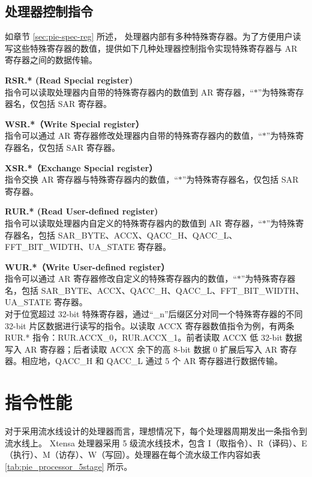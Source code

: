 \documentclass[main\_\_CN.tex]{subfiles}
\begin{document}


\subsection{处理器控制指令}
\label{sec:pie-processor-control-instrucitons}

如章节 \ref{sec:pie-spec-reg} 所述，\chipname{} 处理器内部有多种特殊寄存器。为了方便用户读写这些特殊寄存器的数值，提供如下几种处理器控制指令实现特殊寄存器与 AR 寄存器之间的数据传输。

\textbf{RSR.* (Read Special register)} \\ 指令可以读取处理器内自带的特殊寄存器内的数值到 AR 寄存器，“$*$”为特殊寄存器名，仅包括 SAR 寄存器。

\textbf{WSR.*（Write Special register）} \\
指令可以通过 AR 寄存器修改处理器内自带的特殊寄存器内的数值，“$*$”为特殊寄存器名，仅包括 SAR 寄存器。

\textbf{XSR.*（Exchange Special register）} \\
 指令交换 AR 寄存器与特殊寄存器内的数值，“$*$”为特殊寄存器名，仅包括 SAR 寄存器。

\textbf{RUR.* (Read User-defined register)}\\ 指令可以读取处理器内自定义的特殊寄存器内的数值到 AR 寄存器，“$*$”为特殊寄存器名，包括 SAR\_BYTE、ACCX、QACC\_H、QACC\_L、FFT\_BIT\_WIDTH、UA\_STATE 寄存器。

\textbf{WUR.*（Write User-defined register）}\\
指令可以通过 AR 寄存器修改自定义的特殊寄存器内的数值，“$*$”为特殊寄存器名，包括 SAR\_BYTE、ACCX、QACC\_H、QACC\_L、FFT\_BIT\_WIDTH、UA\_STATE 寄存器。\\
对于位宽超过 32-bit 特殊寄存器，通过“\_n”后缀区分对同一个特殊寄存器的不同 32-bit 片区数据进行读写的指令。以读取 ACCX 寄存器数值指令为例，有两条 RUR.* 指令：RUR.ACCX\_0，RUR.ACCX\_1。前者读取 ACCX 低 32-bit 数据写入 AR 寄存器；后者读取 ACCX 余下的高 8-bit 数据 0 扩展后写入 AR 寄存器。相应地，QACC\_H 和 QACC\_L 通过 5 个 AR 寄存器进行数据传输。



\clearpage
\section{指令性能}\label{subsec:pie_pipeline}
对于采用流水线设计的处理器而言，理想情况下，每个处理器周期发出一条指令到流水线上。\chipname{} Xtensa 处理器采用 5 级流水线技术，包含 I（取指令）、R（译码）、E（执行）、M（访存）、W（写回）。处理器在每个流水级工作内容如表 \ref{tab:pie_processor_5stage} 所示。\\
\end{document}

